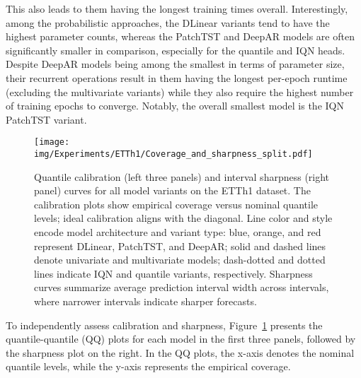 \documentclass[a4paper,oneside,bibliography=totoc]{scrbook}
\begin{document}
This also leads to them having the longest training times overall. 
Interestingly, among the probabilistic approaches, the DLinear variants tend to have the highest parameter counts, whereas the PatchTST and DeepAR models are often significantly smaller in comparison, especially for the quantile and IQN heads.
Despite DeepAR models being among the smallest in terms of parameter size, their recurrent operations result in them having the longest per-epoch runtime (excluding the multivariate variants) while they also require the highest number of training epochs to converge. 
Notably, the overall smallest model is the IQN PatchTST variant. %
\begin{figure}
\centering
\texttt{[image: img/Experiments/ETTh1/Coverage\_and\_sharpness\_split.pdf]}
\caption{Quantile calibration (left three panels) and interval sharpness (right panel) curves for all model variants on the ETTh1 dataset. 
The calibration plots show empirical coverage versus nominal quantile levels; ideal calibration aligns with the diagonal. 
Line color and style encode model architecture and variant type: blue, orange, and red represent DLinear, PatchTST, and DeepAR; solid and dashed lines denote univariate and multivariate models; dash-dotted and dotted lines indicate IQN and quantile variants, respectively.
Sharpness curves summarize average prediction interval width across intervals, where narrower intervals indicate sharper forecasts.}
\label{fig:cov_sha_etth1}
\end{figure}
To independently assess calibration and sharpness, Figure~\ref{fig:cov_sha_etth1} presents the quantile-quantile (QQ) plots for each model in the first three panels, followed by the sharpness plot on the right. In the QQ plots, the x-axis denotes the nominal quantile levels, while the y-axis represents the empirical coverage. 
\end{document}

